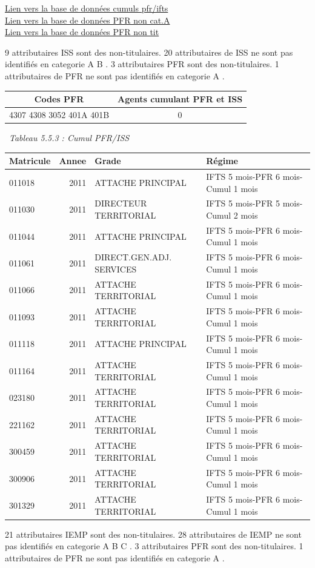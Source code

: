 \href{../Bases/Reglementation/personnels.pfr.ifts.csv}{Lien vers la base de
données cumuls pfr/ifts}\\
\href{../Bases/Reglementation/PFR.non.catA.csv}{Lien vers la base de
données PFR non cat.A}\\
\href{../Bases/Reglementation/PFR.non.tit.csv}{Lien vers la base de données
PFR non tit}

9 attributaires ISS sont des non-titulaires. 20 attributaires de ISS ne
sont pas identifiés en categorie A B . 3 attributaires PFR sont des
non-titulaires. 1 attributaires de PFR ne sont pas identifiés en
categorie A .

\begin{longtable}[]{@{}cc@{}}
\toprule
Codes PFR & Agents cumulant PFR et ISS\tabularnewline
\midrule
\endhead
4307 4308 3052 401A 401B & 0\tabularnewline
\bottomrule
\end{longtable}

~\emph{Tableau 5.5.3 : Cumul PFR/ISS}

\begin{longtable}[]{@{}lrll@{}}
\toprule
Matricule & Annee & Grade & Régime\tabularnewline
\midrule
\endhead
011018 & 2011 & ATTACHE PRINCIPAL & IFTS 5 mois-PFR 6 mois-Cumul 1
mois\tabularnewline
011030 & 2011 & DIRECTEUR TERRITORIAL & IFTS 5 mois-PFR 5 mois-Cumul 2
mois\tabularnewline
011044 & 2011 & ATTACHE PRINCIPAL & IFTS 5 mois-PFR 6 mois-Cumul 1
mois\tabularnewline
011061 & 2011 & DIRECT.GEN.ADJ. SERVICES & IFTS 5 mois-PFR 6 mois-Cumul
1 mois\tabularnewline
011066 & 2011 & ATTACHE TERRITORIAL & IFTS 5 mois-PFR 6 mois-Cumul 1
mois\tabularnewline
011093 & 2011 & ATTACHE TERRITORIAL & IFTS 5 mois-PFR 6 mois-Cumul 1
mois\tabularnewline
011118 & 2011 & ATTACHE PRINCIPAL & IFTS 5 mois-PFR 6 mois-Cumul 1
mois\tabularnewline
011164 & 2011 & ATTACHE TERRITORIAL & IFTS 5 mois-PFR 6 mois-Cumul 1
mois\tabularnewline
023180 & 2011 & ATTACHE TERRITORIAL & IFTS 5 mois-PFR 6 mois-Cumul 1
mois\tabularnewline
221162 & 2011 & ATTACHE TERRITORIAL & IFTS 5 mois-PFR 6 mois-Cumul 1
mois\tabularnewline
300459 & 2011 & ATTACHE TERRITORIAL & IFTS 5 mois-PFR 6 mois-Cumul 1
mois\tabularnewline
300906 & 2011 & ATTACHE TERRITORIAL & IFTS 5 mois-PFR 6 mois-Cumul 1
mois\tabularnewline
301329 & 2011 & ATTACHE TERRITORIAL & IFTS 5 mois-PFR 6 mois-Cumul 1
mois\tabularnewline
\bottomrule
\end{longtable}

21 attributaires IEMP sont des non-titulaires. 28 attributaires de IEMP
ne sont pas identifiés en categorie A B C . 3 attributaires PFR sont des
non-titulaires. 1 attributaires de PFR ne sont pas identifiés en
categorie A .

